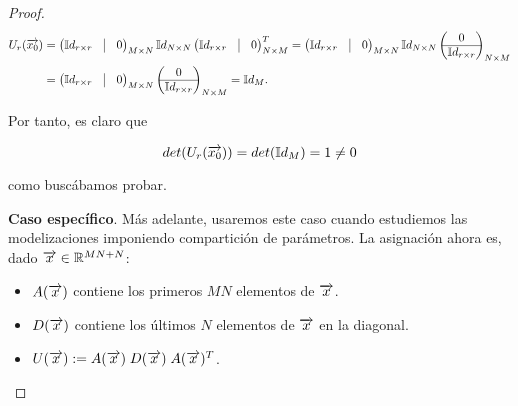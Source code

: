 \begin{proof}
    \begin{equation}
        \begin{split}
            U_r(\nv{x_0}) &= \begin{pmatrix}
                \mathbb{I}d_{r \times r} & \vline & 0 \\
            \end{pmatrix}_{M \times N}
            \mathbb{I}d_{N \times N}
            \begin{pmatrix}
                \mathbb{I}d_{r \times r} & \vline & 0 \\
            \end{pmatrix}^T_{N \times M} = \begin{pmatrix}
                \mathbb{I}d_{r \times r} & \vline & 0 \\
            \end{pmatrix}_{M \times N}
            \mathbb{I}d_{N \times N}
            \begin{pmatrix}
                0 \\
                \hline
                \mathbb{I}d_{r \times r}
            \end{pmatrix}_{N \times M} \\
            &= \begin{pmatrix}
                \mathbb{I}d_{r \times r} & \vline & 0 \\
            \end{pmatrix}_{M \times N}
            \begin{pmatrix}
                0 \\
                \hline
                \mathbb{I}d_{r \times r}
            \end{pmatrix}_{N \times M} = \mathbb{I}d_M.
        \end{split}
    \end{equation}

    Por tanto, es claro que

    \begin{equation}
        det(U_r(\overrightarrow{x_0})) = det(\mathbb{I}d_M) = 1 \neq 0
    \end{equation}

    como buscábamos probar.

    \textbf{Caso específico}. Más adelante, usaremos este caso cuando estudiemos las modelizaciones imponiendo compartición de parámetros. La asignación ahora es, dado $\overrightarrow{x} \in \mathbb{R}^{MN + N}$:

    \begin{itemize}
        \item $A(\overrightarrow{x})$ contiene los primeros $MN$ elementos de $\overrightarrow{x}$.
        \item $D(\overrightarrow{x})$ contiene los últimos $N$ elementos de $\overrightarrow{x}$ en la diagonal.
        \item $U(\overrightarrow{x}) := A(\overrightarrow{x}) \; D(\overrightarrow{x}) \; A(\overrightarrow{x})^T$.
    \end{itemize}


\end{proof}
